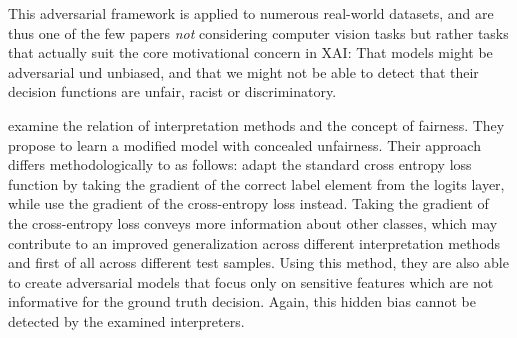 This adversarial framework is applied to numerous real-world datasets, and are thus one of the few papers \textit{not} considering computer vision tasks but rather tasks that actually suit the core motivational concern in XAI: That models might be adversarial und unbiased, and that we might not be able to detect that their decision functions are unfair, racist or discriminatory. 

\cite{dimanov2020you} examine the relation of interpretation methods and the concept of fairness. They propose to learn a modified model with concealed unfairness. Their approach differs methodologically to \cite{fooling_nn_interpreters} as follows: 
\cite{fooling_nn_interpreters} adapt the standard cross entropy loss function by taking the gradient of the correct label element from the logits layer, while \cite{dimanov2020you} use the gradient of the cross-entropy loss instead. 
Taking the gradient of the cross-entropy loss conveys more information about other classes, which may contribute to an improved generalization across different interpretation methods and first of all across different test samples. 
Using this method, they are also able to create adversarial models that focus only on sensitive features which are not informative for the ground truth decision. Again, this hidden bias cannot be detected by the examined interpreters. 
